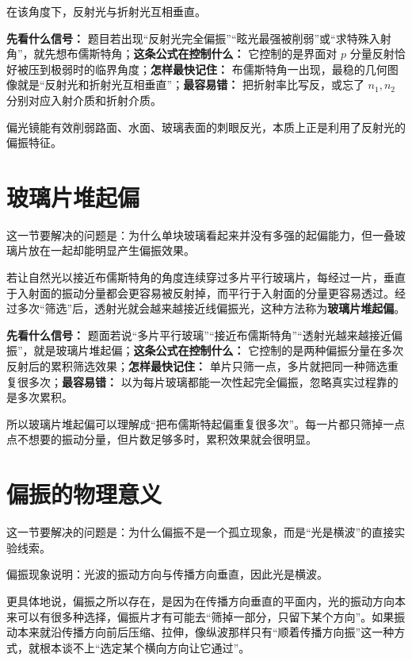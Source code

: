 \documentclass[lang=cn,11pt]{elegantbook}
\newcommand{\bridge}[1]{\begin{note}#1\end{note}}
\begin{document}
在该角度下，反射光与折射光互相垂直。

\begin{note}
\textbf{先看什么信号：} 题目若出现“反射光完全偏振”“眩光最强被削弱”或“求特殊入射角”，就先想布儒斯特角；\textbf{这条公式在控制什么：} 它控制的是界面对 \(p\) 分量反射恰好被压到极弱时的临界角度；\textbf{怎样最快记住：} 布儒斯特角一出现，最稳的几何图像就是“反射光和折射光互相垂直”；\textbf{最容易错：} 把折射率比写反，或忘了 \(n_1,n_2\) 分别对应入射介质和折射介质。
\end{note}

\bridge{偏光镜能有效削弱路面、水面、玻璃表面的刺眼反光，本质上正是利用了反射光的偏振特征。}

\section{玻璃片堆起偏}

这一节要解决的问题是：为什么单块玻璃看起来并没有多强的起偏能力，但一叠玻璃片放在一起却能明显产生偏振效果。

若让自然光以接近布儒斯特角的角度连续穿过多片平行玻璃片，每经过一片，垂直于入射面的振动分量都会更容易被反射掉，而平行于入射面的分量更容易透过。经过多次“筛选”后，透射光就会越来越接近线偏振光，这种方法称为\textbf{玻璃片堆起偏}。

\begin{note}
\textbf{先看什么信号：} 题面若说“多片平行玻璃”“接近布儒斯特角”“透射光越来越接近偏振”，就是玻璃片堆起偏；\textbf{这条公式在控制什么：} 它控制的是两种偏振分量在多次反射后的累积筛选效果；\textbf{怎样最快记住：} 单片只筛一点，多片就把同一种筛选重复很多次；\textbf{最容易错：} 以为每片玻璃都能一次性起完全偏振，忽略真实过程靠的是多次累积。
\end{note}

\begin{remark}
所以玻璃片堆起偏可以理解成“把布儒斯特起偏重复很多次”。每一片都只筛掉一点点不想要的振动分量，但片数足够多时，累积效果就会很明显。
\end{remark}

\section{偏振的物理意义}

这一节要解决的问题是：为什么偏振不是一个孤立现象，而是“光是横波”的直接实验线索。

偏振现象说明：光波的振动方向与传播方向垂直，因此光是横波。

更具体地说，偏振之所以存在，是因为在传播方向垂直的平面内，光的振动方向本来可以有很多种选择，偏振片才有可能去“筛掉一部分，只留下某个方向”。如果振动本来就沿传播方向前后压缩、拉伸，像纵波那样只有“顺着传播方向振”这一种方式，就根本谈不上“选定某个横向方向让它通过”。
\end{document}

